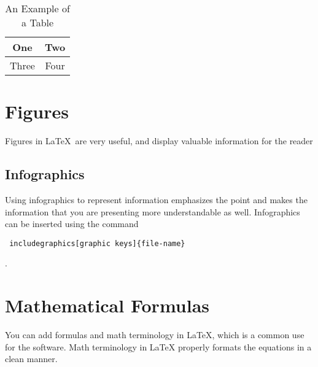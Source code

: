 \documentclass[12pt,journal,compsoc]{IEEEtran}
\begin{document}
%
\begin{table}[h]
\renewcommand{\arraystretch}{1.3}
\caption{An Example of a Table}
\label{table_example}
\centering
\begin{tabular}{|c||c|}
\hline
One & Two\\
\hline
Three & Four\\
\hline
\end{tabular}
\end{table}

\section{Figures}
Figures in \LaTeX\ are very useful, and display valuable information for the reader
\subsection{Infographics}
Using infographics to represent information emphasizes the point and makes the information that you are presenting more understandable as well. Infographics can be inserted using the command \begin{verbatim} includegraphics[graphic keys]{file-name} \end{verbatim}.
\section{Mathematical Formulas}
You can add formulas and math terminology in LaTeX, which is a common use for the software. Math terminology in LaTeX properly formats the equations in a clean manner.  

\end{document}
